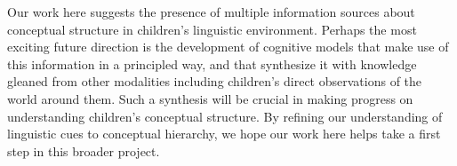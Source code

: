 \documentclass[10pt, letterpaper]{article}
\begin{document}
Our work here suggests the presence of multiple information sources about conceptual structure in children's linguistic environment. Perhaps the most exciting future direction is the development of cognitive models that make use of this information in a principled way, and that synthesize it with knowledge gleaned from other modalities including children's direct observations of the world around them. Such a synthesis will be crucial in making progress on understanding children's conceptual structure. By refining our understanding of linguistic cues to conceptual hierarchy, we hope our work here helps take a first step in this broader project.




\setlength{\bibleftmargin}{.125in}
\setlength{\bibindent}{-\bibleftmargin}


\end{document}
